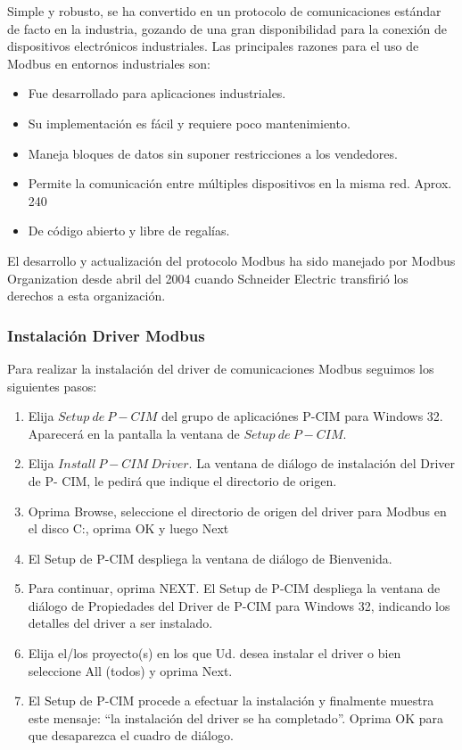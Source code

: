Simple y robusto, se ha convertido en un protocolo de 
comunicaciones estándar de facto en la industria, gozando de una gran disponibilidad para la 
conexión de dispositivos electrónicos industriales. Las principales razones para el uso de Modbus 
en entornos industriales son:
\begin{itemize}
 \item Fue desarrollado para aplicaciones industriales.
 \item Su implementación es fácil y requiere poco mantenimiento.
 \item Maneja bloques de datos sin suponer restricciones a los vendedores.
 \item Permite la comunicación entre múltiples dispositivos en la misma red. Aprox. 240
 \item De código abierto y libre de regalías.%
\end{itemize}
El desarrollo y actualización del protocolo Modbus ha sido manejado por Modbus Organization desde
abril del 2004 cuando Schneider Electric transfirió los derechos a esta organización.

\subsubsection{Instalación Driver Modbus}
Para realizar la instalación del driver de comunicaciones Modbus seguimos los siguientes pasos: 

\begin{enumerate}
 \item Elija $Setup~de~P-CIM$ del grupo de aplicaciónes P-CIM para Windows 32.
Aparecerá en la pantalla la ventana de $Setup~de~P-CIM$.
\item Elija $Install~P-CIM~Driver$. La ventana de diálogo de instalación del Driver de P-
CIM, le pedirá que indique el directorio de origen.
\item Oprima Browse, seleccione el directorio de origen del driver para Modbus en el disco 
C:, oprima OK y luego Next
\item El Setup de P-CIM despliega la ventana de diálogo de Bienvenida.
\item Para continuar, oprima NEXT. El Setup de P-CIM despliega la ventana de
diálogo de Propiedades del Driver de P-CIM para Windows 32, indicando los
detalles del driver a ser instalado.
\item Elija el/los proyecto(s) en los que Ud. desea instalar el driver o bien seleccione
All (todos) y oprima Next.
\item El Setup de P-CIM procede a efectuar la instalación y finalmente muestra este mensaje: 
“la instalación del driver se ha completado”. Oprima OK para que desaparezca el cuadro de diálogo.
\end{enumerate}

